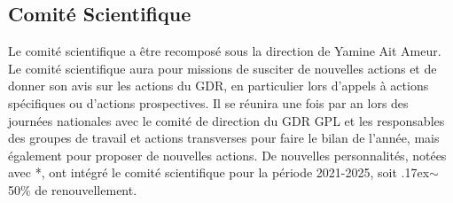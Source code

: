 \documentclass[11pt]{article}
\newcommand{\mynote}[3][black]{\textcolor{#1}{\fbox{\bfseries\sffamily\scriptsize{#2}}
{\small$\blacktriangleright$\textsf{\emph{#3}}$\blacktriangleleft$}}}
\newcommand{\pem}[1]{} %
\begin{document}
{{\begin{tabular}{|p{6cm}p{8.5cm}|}
\hline


\hline
		\end{tabular}
}

\medskip

\noindent
}



\subsection{Comité  Scientifique}
Le comité scientifique a être recomposé sous la direction de Yamine Ait Ameur.
Le comité scientifique aura pour missions de susciter de nouvelles actions et de donner son avis sur les actions du GDR, en particulier lors d'appels à actions spécifiques ou d'actions prospectives. 
Il se réunira une fois par an lors des journées nationales avec le comité de direction du GDR GPL et les responsables des groupes de travail et actions transverses pour
faire le bilan de l'année, mais également pour proposer de nouvelles actions.
De nouvelles personnalités, notées avec *, ont intégré le comité scientifique pour la période 2021-2025, soit {\raise.17ex\hbox{$\scriptstyle\sim$}}50\% de renouvellement. 
\end{document}
